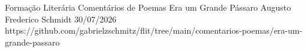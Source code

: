 \documentclass{article}
\begin{document}
\cover
    {Formação Literária}        %
    {Comentários de Poemas}     %
    {Era um Grande Pássaro}     %
    {Augusto Frederico Schmidt} %
    {30/07/2026}                %
    {https://github.com/gabrielzschmitz/flit/tree/main/comentarios-poemas/era-um-grande-passaro}





\newpage
\printbibliography[title=Referências]
\end{document}
